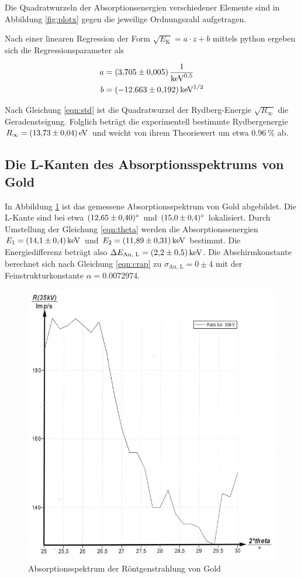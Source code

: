 Die Quadratwurzeln der Absorptionsenergien verschiedener Elemente
sind in Abbildung \ref{fig:plotx} gegen die jeweilige Ordnungszahl aufgetragen.

Nach einer linearen Regression der Form $\sqrt{E_\text{K}} = a \cdot z + b$ 
mittels python ergeben sich die Regressionsparameter als

\begin{align*}
  a &= \SI{3.705 +- 0.005}{\per \kilo \eV \tothe{1/2}} \\
  b &= \SI{-12.663 +- 0.192}{\kilo \eV \tothe{1/2}}
\end{align*}

Nach Gleichung \eqref{eqn:std} ist die Quadratwurzel der Rydberg-Energie
$\sqrt{R_\infty}$ die Geradensteigung. Folglich beträgt die experimentell
bestimmte Rydbergenergie $R_\infty = \SI{13.73 +- 0.04}{\eV}$ und weicht von ihrem
Theoriewert um etwa $\SI{0.96}{\percent}$ ab.

\subsection{Die L-Kanten des Absorptionsspektrums von Gold}

In Abbildung \ref{fig:plot7} ist das gemessene Absorptionsspektrum von Gold abgebildet.
Die L-Kante sind bei etwa $\SI{12.65 +- 0.4}{\degree}$ und $\SI{15.0 +- 0.4}{\degree}$ lokalisiert.
Durch Umstellung der Gleichung \eqref{eqn:theta} werden die Absorptionssenergien 
$ E_1 = \SI{14.1 +- 0.4}{\kilo\eV}$ und $ E_2 = \SI{11.89 +- 0.31}{\kilo\eV}$ bestimmt.
Die Energiedifferenz beträgt also $\Delta E_\text{Au, L} = \SI{2.2 +- 0.5}{\kilo\eV}$.
Die Abschirmkonstante berechnet sich nach Gleichung \eqref{eqn:crap} zu 
$\sigma_\text{Au, L} = 0 \pm 4$ mit der Feinstrukturkonstante
$\alpha = 0.0072974$.

\begin{figure}[H]
  \centering
  \includegraphics[scale=0.3]{content/bild3.png}
  \caption{Absorptionsspektrum der Röntgenstrahlung von Gold}
  \label{fig:plot7}
\end{figure}







